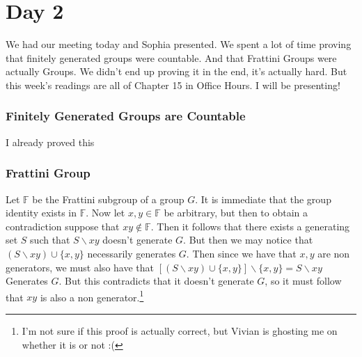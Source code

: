 \section{Day 2}

We had our meeting today and Sophia presented. We spent a lot of time proving that finitely generated groups were countable. And that Frattini Groups were actually Groups. We didn't end up proving it in the end, it's actually hard. But this week's readings are all of Chapter 15 in Office Hours. I will be presenting!
\subsubsection{Finitely Generated Groups are Countable}

I already proved this
\subsubsection{Frattini Group}
Let $\mathbb{F}$ be the Frattini subgroup of a group $G$. It is immediate that the group identity exists in $\mathbb{F}$. Now let $x,y\in\mathbb{F}$ be arbitrary, but then to obtain a contradiction suppose that $xy\notin\mathbb{F}$. Then it follows that there exists a generating set $S$ such that $S\backslash xy$ doesn't generate $G$. But then we may notice that $(S\backslash xy)\cup\{x,y\}$ necessarily generates $G$. Then since we have that $x,y$ are non generators, we must also have that $[(S\backslash xy)\cup\{x,y\}]\backslash\{x,y\}=S\backslash xy$ Generates $G$. But this contradicts that it doesn't generate $G$, so it must follow that $xy$ is also a non generator.\footnote{I'm not sure if this proof is actually correct, but Vivian is ghosting me on whether it is or not :(}


